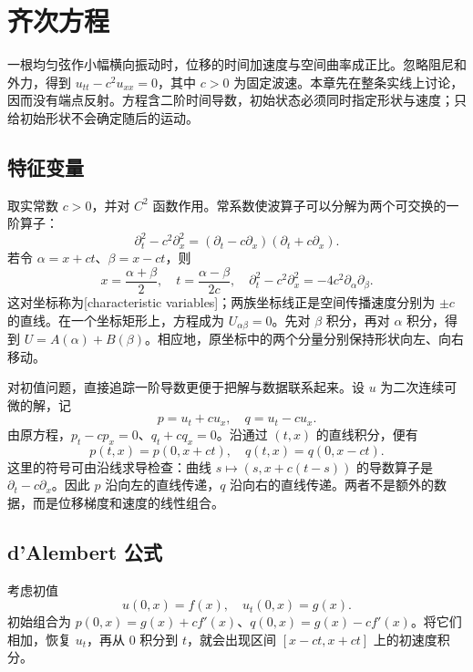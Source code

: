 \section{齐次方程}
\label{b2:sec:0901}

一根均匀弦作小幅横向振动时，位移的时间加速度与空间曲率成正比。忽略阻尼和外力，得到 \(u_{tt}-c^2u_{xx}=0\)，其中 \(c>0\) 为固定波速。本章先在整条实线上讨论，因而没有端点反射。方程含二阶时间导数，初始状态必须同时指定形状与速度；只给初始形状不会确定随后的运动。

\subsection{特征变量}
\label{b2:subsec:090101}

取实常数 \(c>0\)，并对 \(C^2\) 函数作用。常系数使波算子可以分解为两个可交换的一阶算子：
\[
 \partial_t^2-c^2\partial_x^2
 =(\partial_t-c\partial_x)(\partial_t+c\partial_x).
\]
若令 \(\alpha=x+ct\)、\(\beta=x-ct\)，则
\[
 x=\dfrac{\alpha+\beta}{2},\quad
 t=\dfrac{\alpha-\beta}{2c},\quad
 \partial_t^2-c^2\partial_x^2=-4c^2\partial_\alpha\partial_\beta.
\]
这对坐标称为[characteristic variables]；两族坐标线正是空间传播速度分别为 \(\pm c\) 的直线。在一个坐标矩形上，方程成为 \(U_{\alpha\beta}=0\)。先对 \(\beta\) 积分，再对 \(\alpha\) 积分，得到 \(U=A(\alpha)+B(\beta)\)。相应地，原坐标中的两个分量分别保持形状向左、向右移动。

\ProseParagraphBreak

对初值问题，直接追踪一阶导数更便于把解与数据联系起来。设 \(u\) 为二次连续可微的解，记
\[
 p=u_t+cu_x,\quad q=u_t-cu_x.
\]
由原方程，\(p_t-cp_x=0\)、\(q_t+cq_x=0\)。沿通过 \((t,x)\) 的直线积分，便有
\[
 p(t,x)=p(0,x+ct),\quad q(t,x)=q(0,x-ct).
\]
这里的符号可由沿线求导检查：曲线 \(s\mapsto(s,x+c(t-s))\) 的导数算子是 \(\partial_t-c\partial_x\)。因此 \(p\) 沿向左的直线传递，\(q\) 沿向右的直线传递。两者不是额外的数据，而是位移梯度和速度的线性组合。

\subsection{d'Alembert 公式}
\label{b2:subsec:090102}

考虑初值
\[
 u(0,x)=f(x),\quad u_t(0,x)=g(x).
\]
初始组合为 \(p(0,x)=g(x)+cf'(x)\)、\(q(0,x)=g(x)-cf'(x)\)。将它们相加，恢复 \(u_t\)，再从 \(0\) 积分到 \(t\)，就会出现区间 \([x-ct,x+ct]\) 上的初速度积分。

